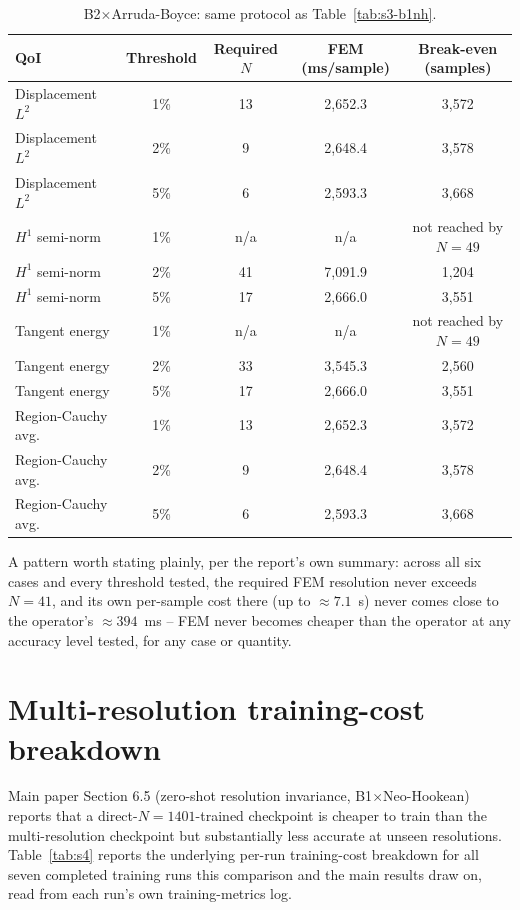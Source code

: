 \documentclass[11pt]{article}
\begin{document}
\begin{table}[h]
\centering
\caption{B2$\times$Arruda-Boyce: same protocol as Table~\ref{tab:s3-b1nh}.}
\label{tab:s3-b2ab}
\small
\begin{tabular}{lcccc}
\toprule
QoI & Threshold & Required $N$ & FEM (ms/sample) & Break-even (samples) \\
\midrule
Displacement $L^2$  & 1\% & 13  & 2{,}652.3 & 3{,}572 \\
Displacement $L^2$  & 2\% & 9   & 2{,}648.4 & 3{,}578 \\
Displacement $L^2$  & 5\% & 6   & 2{,}593.3 & 3{,}668 \\
$H^1$ semi-norm     & 1\% & n/a & n/a       & not reached by $N{=}49$ \\
$H^1$ semi-norm     & 2\% & 41  & 7{,}091.9 & 1{,}204 \\
$H^1$ semi-norm     & 5\% & 17  & 2{,}666.0 & 3{,}551 \\
Tangent energy      & 1\% & n/a & n/a       & not reached by $N{=}49$ \\
Tangent energy      & 2\% & 33  & 3{,}545.3 & 2{,}560 \\
Tangent energy      & 5\% & 17  & 2{,}666.0 & 3{,}551 \\
Region-Cauchy avg.\ & 1\% & 13  & 2{,}652.3 & 3{,}572 \\
Region-Cauchy avg.\ & 2\% & 9   & 2{,}648.4 & 3{,}578 \\
Region-Cauchy avg.\ & 5\% & 6   & 2{,}593.3 & 3{,}668 \\
\bottomrule
\end{tabular}
\end{table}

A pattern worth stating plainly, per the report's own summary: across
all six cases and every threshold tested, the required FEM resolution
never exceeds $N{=}41$, and its own per-sample cost there (up to
$\approx7.1$~s) never comes close to the operator's $\approx394$~ms --
FEM never becomes cheaper than the operator at any accuracy level tested,
for any case or quantity.

\FloatBarrier
\section{Multi-resolution training-cost breakdown}
\label{sec:s4}
Main paper Section 6.5 (zero-shot resolution invariance, B1$\times$Neo-Hookean)
reports that a direct-$N{=}1401$-trained checkpoint is cheaper to train
than the multi-resolution checkpoint but substantially less accurate at
unseen resolutions. Table~\ref{tab:s4} reports the underlying per-run
training-cost breakdown for all seven completed training runs this
comparison and the main results draw on, read from each run's own
training-metrics log.
\end{document}
